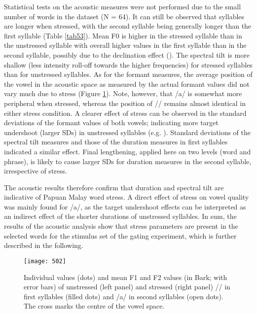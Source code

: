 Statistical tests on the acoustic measures were not performed due to the small number of words in the dataset (N = 64). It can still be observed that syllables are longer when stressed, with the second syllable being generally longer than the first syllable (Table \ref{tab53}). Mean F0 is higher in the stressed syllable than in the unstressed syllable with overall higher values in the first syllable than in the second syllable, possibly due to the declination effect (\citealt{breckenridge_declination_1977}). The spectral tilt is more shallow (less intensity roll-off towards the higher frequencies) for stressed syllables than for unstressed syllables. As for the formant measures, the average position of the vowel in the acoustic space as measured by the actual formant values did not vary much due to stress (Figure \ref{fig502}). Note, however, that /a/ is somewhat more peripheral when stressed, whereas the position of // remains almost identical in either stress condition. A clearer effect of stress can be observed in the standard deviations of the formant values of both vowels; indicating more target undershoot (larger SDs) in unstressed syllables (e.g. \citealt{lindblom_spectrographic_1963}). Standard deviations of the spectral tilt measures and those of the duration measures in first syllables indicated a similar effect. Final lengthening, applied here on two levels (word and phrase), is likely to cause larger SDs for duration measures in the second syllable, irrespective of stress. \par

\largerpage
The acoustic results therefore confirm that duration and spectral tilt are indicative of Papuan Malay word stress. A direct effect of stress on vowel quality was mainly found for /a/, as the target undershoot effects can be interpreted as an indirect effect of the shorter durations of unstressed syllables. In sum, the results of the acoustic analysis show that stress parameters are present in the selected words for the stimulus set of the gating experiment, which is further described in the following.

\begin{figure}
\texttt{[image: 502]}
\caption{Individual values (dots) and mean F1 and F2 values (in Bark; with error bars) of unstressed (left panel) and stressed (right panel) // in first syllables (filled dots) and /a/ in second syllables (open dots). The cross marks the centre of the vowel space.}
\label{fig502}
\end{figure}


